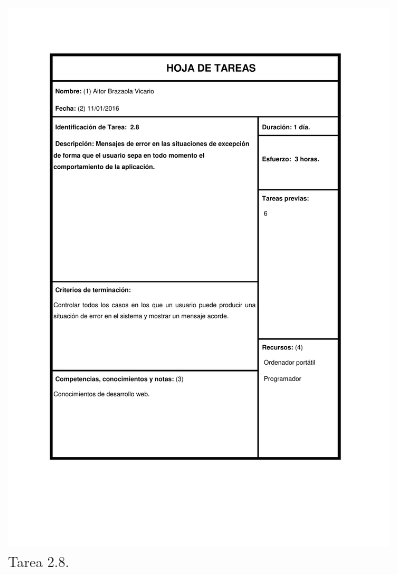 \documentclass{DeustoFDP}
\begin{document}
\begin{figure}[H]
    \centering
    \includegraphics[width=0.9\textwidth]{fig/Tareas/28}
    \caption{Tarea 2.8.}
    \label{fig:t28}
\end{figure}
\end{document}
